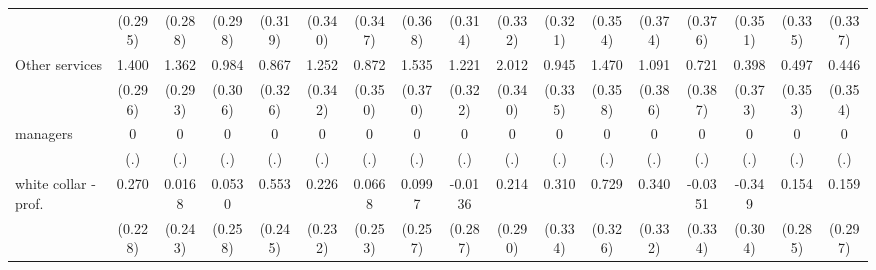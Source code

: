 {\begin{tabular}{l*{16}{c}}
                    &     (0.295)         &     (0.288)         &     (0.298)         &     (0.319)         &     (0.340)         &     (0.347)         &     (0.368)         &     (0.314)         &     (0.332)         &     (0.321)         &     (0.354)         &     (0.374)         &     (0.376)         &     (0.351)         &     (0.335)         &     (0.337)         \\
[1em]
Other services      &       1.400\sym{***}&       1.362\sym{***}&       0.984\sym{**} &       0.867\sym{**} &       1.252\sym{***}&       0.872\sym{*}  &       1.535\sym{***}&       1.221\sym{***}&       2.012\sym{***}&       0.945\sym{**} &       1.470\sym{***}&       1.091\sym{**} &       0.721         &       0.398         &       0.497         &       0.446         \\
                    &     (0.296)         &     (0.293)         &     (0.306)         &     (0.326)         &     (0.342)         &     (0.350)         &     (0.370)         &     (0.322)         &     (0.340)         &     (0.335)         &     (0.358)         &     (0.386)         &     (0.387)         &     (0.373)         &     (0.353)         &     (0.354)         \\
[1em]
managers            &           0         &           0         &           0         &           0         &           0         &           0         &           0         &           0         &           0         &           0         &           0         &           0         &           0         &           0         &           0         &           0         \\
                    &         (.)         &         (.)         &         (.)         &         (.)         &         (.)         &         (.)         &         (.)         &         (.)         &         (.)         &         (.)         &         (.)         &         (.)         &         (.)         &         (.)         &         (.)         &         (.)         \\
[1em]
white collar - prof.&       0.270         &      0.0168         &      0.0530         &       0.553\sym{*}  &       0.226         &      0.0668         &      0.0997         &     -0.0136         &       0.214         &       0.310         &       0.729\sym{*}  &       0.340         &     -0.0351         &      -0.349         &       0.154         &       0.159         \\
                    &     (0.228)         &     (0.243)         &     (0.258)         &     (0.245)         &     (0.232)         &     (0.253)         &     (0.257)         &     (0.287)         &     (0.290)         &     (0.334)         &     (0.326)         &     (0.332)         &     (0.334)         &     (0.304)         &     (0.285)         &     (0.297)         \\

\end{tabular}}
